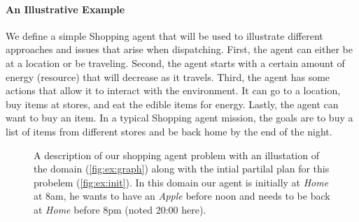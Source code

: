 \paragraph{An Illustrative Example} We define a simple Shopping agent
that will be used to illustrate different approaches and issues that
arise when dispatching. First, the agent can either be at a location or be
traveling. Second, the agent starts with a certain amount of
energy (resource) that will decrease as it travels. Third, the agent has some
actions that allow it to interact with the environment. It can go to a location,
buy items at stores, and eat the edible items for energy. Lastly, the agent can
want to buy an item. In a typical Shopping agent mission,
the goals are to buy a list of items from different stores and be back
home by the end of the night. 

\begin{figure}
  \centering
{}
\hfill
{}
\caption{A description of our shopping agent problem with an
  illustation of the domain (\ref{fig:ex:graph}) along with the intial
  partilal plan for this probelem (\ref{fig:ex:init}). In this domain
  our agent is initially at {\em Home} at 8am, he wants to have an
  {\em Apple}
  before noon and needs to be back 
  at {\em Home} before 8pm (noted 20:00 here).}
\label{fig:Example}
\end{figure}

